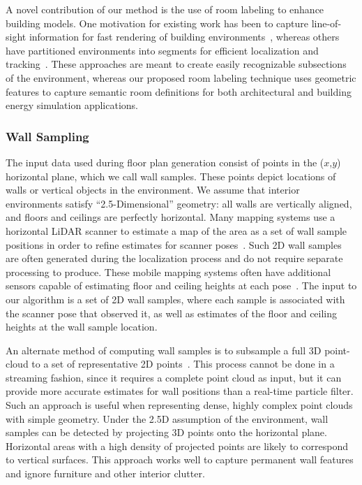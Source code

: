 \documentclass[journal]{IEEEtran}
\begin{document}
A novel contribution of our method is the use of room labeling to enhance building models.  One motivation for existing work has been to capture line-of-sight information for fast rendering of building environments~\cite{WalkthroughRendering}, whereas others have partitioned environments into segments for efficient localization and tracking~\cite{SpectralClustering}.  These approaches are meant to create easily recognizable subsections of the environment, whereas our proposed room labeling technique uses geometric features to capture semantic room definitions for both architectural and building energy simulation applications.

\subsubsection{Wall Sampling}
\label{sssec:wall_sampling}
The input data used during floor plan generation consist of points in the ($x$,$y$) horizontal plane, which we call wall samples.  These points depict locations of walls or vertical objects in the environment.  We assume that interior environments satisfy ``2.5-Dimensional'' geometry:  all walls are vertically aligned, and floors and ceilings are perfectly horizontal.  Many mapping systems use a horizontal LiDAR scanner to estimate a map of the area as a set of wall sample positions in order to refine estimates for scanner poses~\cite{MITBackpack,NickJournal}.  Such 2D wall samples are often generated during the localization process and do not require separate processing to produce.  These mobile mapping systems often have additional sensors capable of estimating floor and ceiling heights at each pose~\cite{Backpack,Quadrotor}.  The input to our algorithm is a set of 2D wall samples, where each sample is associated with the scanner pose that observed it, as well as estimates of the floor and ceiling heights at the wall sample location.

An alternate method of computing wall samples is to subsample a full 3D point-cloud to a set of representative 2D points~\cite{Turner14,Eigencrust,Okorn09}.  This process cannot be done in a streaming fashion, since it requires a complete point cloud as input, but it can provide more accurate estimates for wall positions than a real-time particle filter.  Such an approach is useful when representing dense, highly complex point clouds with simple geometry.  Under the 2.5D assumption of the environment, wall samples can be detected by projecting 3D points onto the horizontal plane.  Horizontal areas with a high density of projected points are likely to correspond to vertical surfaces.  This approach works well to capture permanent wall features and ignore furniture and other interior clutter.
\end{document}
